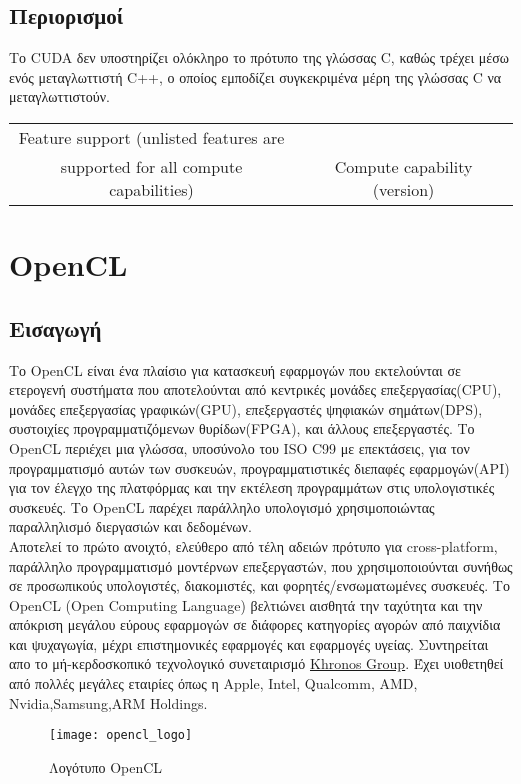 \subsection{Περιορισμοί}
 Το CUDA δεν υποστηρίζει ολόκληρο το πρότυπο της γλώσσας C, καθώς τρέχει μέσω ενός μεταγλωττιστή C++, ο οποίος εμποδίζει συγκεκριμένα μέρη της γλώσσας C να μεταγλωττιστούν.
 
\begin{table}
\begin{tabular}{ | c | c |}
Feature support (unlisted features are\\ supported for all compute capabilities) & Compute capability (version)\\ \hline
\end{tabular}
\end{table}

\pagebreak
\section{OpenCL}
\subsection{Εισαγωγή}
Το OpenCL είναι ένα πλαίσιο για κατασκευή εφαρμογών που εκτελούνται σε ετερογενή συστήματα που αποτελούνται από κεντρικές μονάδες επεξεργασίας(CPU), μονάδες επεξεργασίας γραφικών(GPU), επεξεργαστές ψηφιακών σημάτων(DPS), συστοιχίες προγραμματιζόμενων θυρίδων(FPGA), και άλλους επεξεργαστές. Το OpenCL περιέχει μια γλώσσα, υποσύνολο του ISO C99 με επεκτάσεις, για τον προγραμματισμό αυτών των συσκευών, προγραμματιστικές διεπαφές εφαρμογών(API) για τον έλεγχο της πλατφόρμας και την εκτέλεση προγραμμάτων στις υπολογιστικές συσκευές. Το OpenCL παρέχει παράλληλο υπολογισμό χρησιμοποιώντας παραλληλισμό διεργασιών και δεδομένων.\\
Αποτελεί το πρώτο ανοιχτό, ελεύθερο από τέλη αδειών πρότυπο για cross-platform, παράλληλο προγραμματισμό μοντέρνων επεξεργαστών, που χρησιμοποιούνται συνήθως σε προσωπικούς υπολογιστές, διακομιστές, και φορητές/ενσωματωμένες συσκευές. Το OpenCL (Open Computing Language) βελτιώνει αισθητά την ταχύτητα και την απόκριση μεγάλου εύρους εφαρμογών σε διάφορες κατηγορίες αγορών από παιχνίδια και ψυχαγωγία, μέχρι επιστημονικές εφαρμογές και εφαρμογές υγείας. Συντηρείται απο το μή-κερδοσκοπικό τεχνολογικό συνεταιρισμό \href{http://www.khronos.org}{Khronos Group}. Έχει υιοθετηθεί από πολλές μεγάλες εταιρίες όπως η Apple, Intel, Qualcomm, AMD, Nvidia,Samsung,ARM Holdings.
\begin{figure}[h]
	\texttt{[image: opencl\_logo]}
	\centering
	\caption{Λογότυπο OpenCL}
\end{figure}
